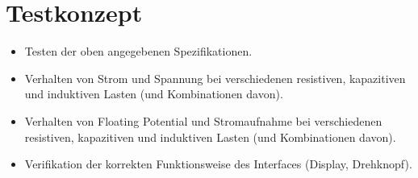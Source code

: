 \documentclass{article}
\begin{document}
\section{Testkonzept}

\begin{itemize}
    \item
        Testen der oben angegebenen Spezifikationen.
    \item
        Verhalten  von  Strom  und   Spannung  bei  verschiedenen  resistiven,
        kapazitiven und induktiven Lasten (und Kombinationen davon).
    \item
        Verhalten von  Floating Potential und Stromaufnahme  bei verschiedenen
        resistiven,  kapazitiven  und  induktiven  Lasten  (und  Kombinationen
        davon).
    \item
        Verifikation  der korrekten  Funktionsweise  des Interfaces  (Display,
        Drehknopf).
\end{itemize}
\end{document}
